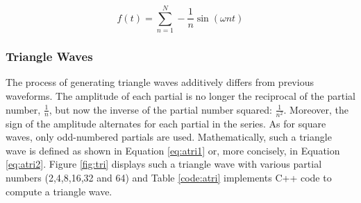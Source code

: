   \begin{equation}
    f(t) = \sum\limits_{n=1}^N -\frac{1}{n} \sin(\omega n t)
    \label{eq:aramp}
  \end{equation}

  \begin{figure}[h!]

    \TopFloatBoxes

    \begin{floatrow}



    \end{floatrow}

  \end{figure}

  \subsubsection{Triangle Waves}

  The process of generating triangle waves additively differs from previous waveforms. The amplitude of each partial is no longer the reciprocal of the partial number, $\frac{1}{n}$, but now the inverse of the partial number squared: $\frac{1}{n^2}$. Moreover, the sign of the amplitude alternates for each partial in the series. As for square waves, only odd-numbered partials are used. Mathematically, such a triangle wave is defined as shown in Equation \ref{eq:atri1} or, more concisely, in Equation \ref{eq:atri2}. Figure \ref{fig:tri} displays such a triangle wave with various partial numbers (2,4,8,16,32 and 64) and Table \ref{code:atri} implements C++ code to compute a triangle wave.

